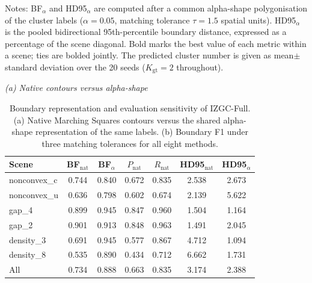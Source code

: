 \begin{table}[tbp]
\vspace{2pt}
\noindent\footnotesize{Notes: BF$_{\alpha}$ and HD95$_{\alpha}$ are computed after a common alpha-shape polygonisation of the cluster labels ($\alpha=0.05$, matching tolerance $\tau=1.5$ spatial units). HD95$_{\alpha}$ is the pooled bidirectional 95th-percentile boundary distance, expressed as a percentage of the scene diagonal. Bold marks the best value of each metric within a scene; ties are bolded jointly. The predicted cluster number is given as mean$\pm$standard deviation over the 20 seeds ($K_{\mathrm{gt}}=2$ throughout).}
\end{table}

\begin{table}[tbp]
\centering
\caption{Boundary representation and evaluation sensitivity of IZGC-Full. (a) Native Marching Squares contours versus the shared alpha-shape representation of the same labels. (b) Boundary F1 under three matching tolerances for all eight methods.}
\label{tab:S11_native_alpha}
\scriptsize
\setlength{\tabcolsep}{4pt}
\renewcommand{\arraystretch}{0.95}
\noindent\textit{(a) Native contours versus alpha-shape}
\par\vspace{2pt}
\begin{tabular*}{0.92\textwidth}{@{\extracolsep{\fill}}lcccccc@{}}
\toprule
Scene & BF$_{\mathrm{nat}}$ & BF$_{\alpha}$ & $P_{\mathrm{nat}}$ & $R_{\mathrm{nat}}$ & HD95$_{\mathrm{nat}}$ & HD95$_{\alpha}$ \\
\midrule
nonconvex\_c & 0.744 & 0.840 & 0.672 & 0.835 & 2.538 & 2.673 \\
nonconvex\_u & 0.636 & 0.798 & 0.602 & 0.674 & 2.139 & 5.622 \\
gap\_4 & 0.899 & 0.945 & 0.847 & 0.960 & 1.504 & 1.164 \\
gap\_2 & 0.901 & 0.913 & 0.848 & 0.963 & 1.491 & 2.045 \\
density\_3 & 0.691 & 0.945 & 0.577 & 0.867 & 4.712 & 1.094 \\
density\_8 & 0.535 & 0.890 & 0.434 & 0.712 & 6.662 & 1.731 \\
\midrule
All & 0.734 & 0.888 & 0.663 & 0.835 & 3.174 & 2.388 \\
\bottomrule
\end{tabular*}


\end{table}
